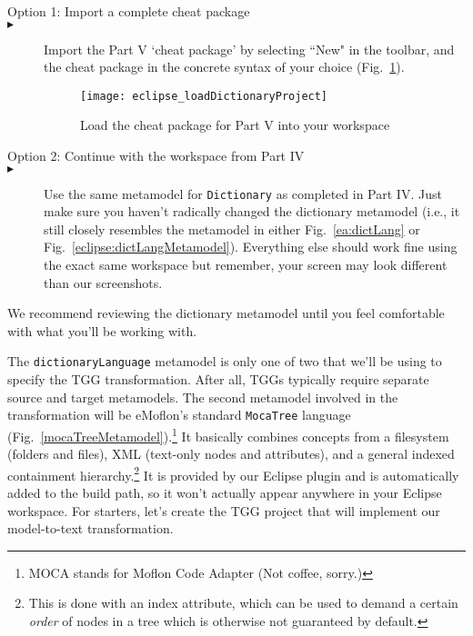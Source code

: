 \begin{description}

\item[Option 1: Import a complete cheat package]

\item[$\blacktriangleright$] \hspace{0.3cm} Import the Part V `cheat package' by selecting ``New" in the toolbar, and the cheat package in the concrete syntax
of your choice (Fig.~\ref{eclipse_cheatPackage}).

\vspace{0.5cm}

\begin{figure}[htbp]
\begin{center}
  \texttt{[image: eclipse\_loadDictionaryProject]}
  \caption{Load the cheat package for Part V into your workspace}
  \label{eclipse_cheatPackage}
\end{center}
\end{figure}

\vspace{0.5cm}

\item[Option 2: Continue with the workspace from Part IV]


\item[$\blacktriangleright$] \hspace{0.3cm} Use the same metamodel for \texttt{Dictionary} as completed in Part IV. Just make sure you haven't radically changed
the dictionary metamodel (i.e., it still closely resembles the metamodel in either Fig.~\ref{ea:dictLang} or Fig.~\ref{eclipse:dictLangMetamodel}). Everything
else should work fine using the exact same workspace but remember, your screen may look different than our screenshots.

\end{description}


We recommend reviewing the dictionary metamodel until you feel comfortable with what you'll be working with. 

\newpage

The \texttt{dictionaryLanguage} metamodel is only one of two that we'll be using to specify the TGG transformation. After all, TGGs typically require separate
source and target metamodels. The second metamodel involved in the transformation will be eMoflon's standard \texttt{MocaTree} language
(Fig.~\ref{mocaTreeMetamodel}).\footnote{MOCA stands for Moflon Code Adapter (Not coffee, sorry.)} It basically combines concepts from a filesystem (folders and
files), XML (text-only nodes and attributes), and a general indexed containment hierarchy.\footnote{This is done with an index attribute, which can be used to
demand a certain \emph{order} of nodes in a tree which is otherwise not guaranteed by default.} It is provided by our Eclipse plugin and is automatically added
to the build path, so it won't actually appear anywhere in your Eclipse workspace. For starters, let's create the TGG project that will implement our
model-to-text transformation.

